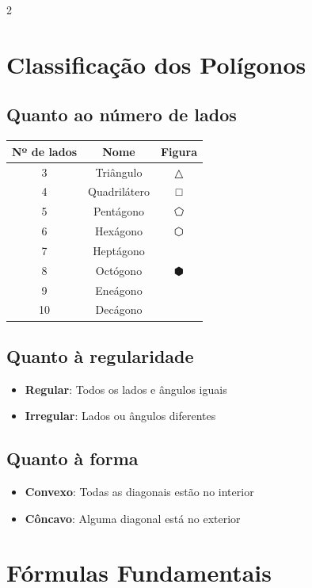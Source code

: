 \documentclass[11pt]{article}
\begin{document}
\begin{multicols}{2}
\section*{Classificação dos Polígonos}

\subsection*{Quanto ao número de lados}

\begin{center}
\begin{tabular}{|c|c|c|}
\hline
\textbf{Nº de lados} & \textbf{Nome} & \textbf{Figura} \\
\hline
3 & Triângulo & △ \\
4 & Quadrilátero & □ \\
5 & Pentágono & ⬠ \\
6 & Hexágono & ⬡ \\
7 & Heptágono & \\
8 & Octógono & ⬢ \\
9 & Eneágono & \\
10 & Decágono & \\
\hline
\end{tabular}
\end{center}

\subsection*{Quanto à regularidade}
\begin{itemize}
\item \textbf{Regular}: Todos os lados e ângulos iguais
\item \textbf{Irregular}: Lados ou ângulos diferentes
\end{itemize}

\subsection*{Quanto à forma}
\begin{itemize}
\item \textbf{Convexo}: Todas as diagonais estão no interior
\item \textbf{Côncavo}: Alguma diagonal está no exterior
\end{itemize}

\section*{Fórmulas Fundamentais}


\end{multicols}
\end{document}
